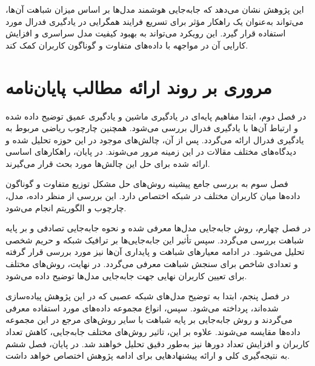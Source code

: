 این پژوهش نشان می‌دهد که جابه‌جایی هوشمند مدل‌ها بر اساس میزان شباهت آن‌ها، می‌تواند به‌عنوان یک راهکار مؤثر برای تسریع فرایند همگرایی در یادگیری فدرال مورد استفاده قرار گیرد. این رویکرد می‌تواند به بهبود کیفیت مدل سراسری و افزایش کارایی آن در مواجهه با داده‌های متفاوت و گوناگون کاربران کمک کند.



\section{مروری بر روند ارائه مطالب پایان‌نامه}

در فصل دوم، ابتدا مفاهیم پایه‌ای در یادگیری ماشین و یادگیری عمیق توضیح داده شده و ارتباط آن‌ها با یادگیری فدرال بررسی می‌شود. همچنین چارچوب ریاضی مربوط به یادگیری فدرال ارائه می‌گردد. پس از آن، چالش‌های موجود در این حوزه تحلیل شده و دیدگاه‌های مختلف مقالات در این زمینه مرور می‌شوند. در پایان، راهکارهای اساسی ارائه شده برای حل این چالش‌ها مورد بحث قرار می‌گیرند.

فصل سوم به بررسی جامع پیشینه روش‌های حل مشکل توزیع متفاوت و گوناگون داده‌ها میان کاربران مختلف در شبکه اختصاص دارد. این بررسی از منظر داده، مدل، چارچوب و الگوریتم انجام می‌شود.

در فصل چهارم، روش جابه‌جایی مدل‌ها معرفی شده و نحوه جابه‌جایی تصادفی و بر پایه شباهت بررسی می‌گردد. سپس تأثیر این جابه‌جایی‌ها بر ترافیک شبکه و حریم شخصی تحلیل می‌شود. در ادامه معیارهای شباهت و پایداری آن‌ها نیز مورد بررسی قرار گرفته و تعدادی شاخص برای سنجش شباهت معرفی می‌گردد. در نهایت، روش‌های مختلف برای تعیین کاربران نهایی جهت جابه‌جایی مدل‌ها توضیح داده می‌شود.

در فصل پنجم، ابتدا به توضیح مدل‌های شبکه عصبی که در این پژوهش پیاده‌سازی شده‌اند، پرداخته می‌شود. سپس، انواع مجموعه داده‌های مورد استفاده معرفی می‌گردند و روش جابه‌جایی بر پایه شباهت با سایر روش‌های مرجع در این مجموعه داده‌ها مقایسه می‌شوند. علاوه بر این، تاثیر روش‌های مختلف جابه‌جایی، کاهش تعداد کاربران و افزایش تعداد دورها نیز به‌طور دقیق تحلیل خواهند شد.
در پایان، فصل ششم به نتیجه‌گیری کلی و ارائه پیشنهادهایی برای ادامه پژوهش اختصاص خواهد داشت.